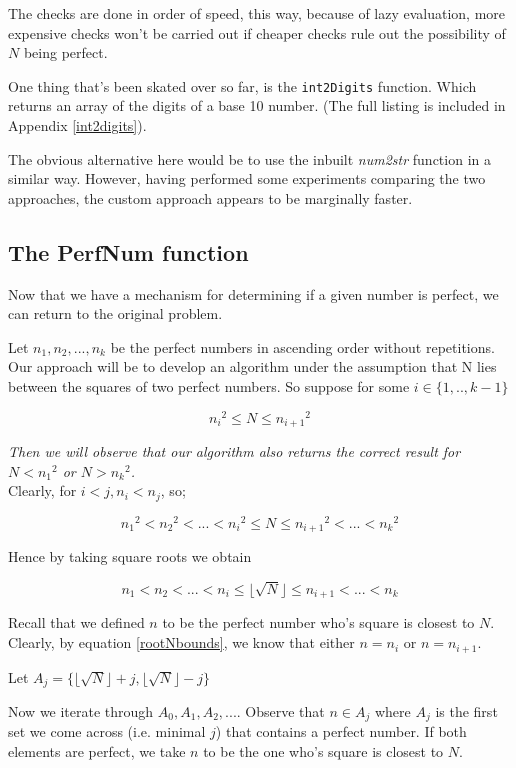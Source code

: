 \documentclass[10pt]{article}
\begin{document}
 The checks are done in order of speed, this way, because of lazy evaluation, more expensive checks won't be carried out if cheaper checks rule out the possibility of $N$ being perfect.
 
 One thing that's been skated over so far, is the \texttt{int2Digits} function. Which returns an array of the digits of a base 10 number. (The full listing is included in Appendix \ref{int2digits}).
 
 The obvious alternative here would be to use the inbuilt \emph{num2str} function in a similar way. However, having performed some experiments comparing the two approaches, the custom approach appears to be marginally faster.
 
\subsection{The PerfNum function}

Now that we have a mechanism for determining if a given number is perfect, we can return to the original problem.

Let $n_1, n_2, ..., n_k$ be the perfect numbers in ascending order without repetitions. Our approach will be to develop an algorithm under the assumption that N lies between the squares of two perfect numbers. So suppose  for some $i \in \{ 1,..,k-1 \}$

$$ {n_i}^2 \leq N \leq {n_{i+1}}^2 $$

\emph{Then we will observe that our algorithm also returns the correct result for $N < {n_1}^2$ or $N > {n_k}^2$.} \\

Clearly, for $i<j, n_i < n_j$, so;

$$ {n_1}^2 < {n_2}^2 < ... < {n_i} ^2 \leq N \leq {n_{i+1}}^2 < ... < {n_k}^2$$

Hence by taking square roots we obtain

\begin{equation} \label{rootNbounds}
 n_1 < n_2 < ... <  n_i \leq \lfloor \sqrt{N} \rfloor \leq n_{i+1} < ... < n_k 
\end{equation}

Recall that we defined $n$ to be the perfect number who's square is closest to $N$. Clearly, by equation \ref{rootNbounds}, we know that either $n = n_i$ or $n = n_{i+1}$. 

Let $A_j =\{  \lfloor \sqrt{N} \rfloor + j,  \lfloor \sqrt{N} \rfloor  - j \} $

Now we iterate through $A_0, A_1, A_2,...$. Observe that $n \in A_j$ where $A_j$ is the first set we come across (i.e. minimal $j$) that contains a perfect number. If both elements are perfect, we take $n$ to be the one who's square is closest to $N$.
\end{document}
